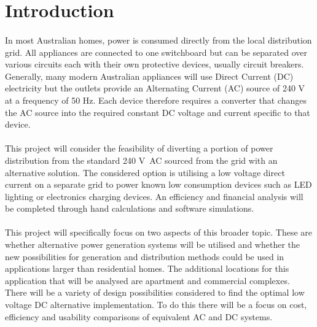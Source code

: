 
\section{Introduction}

\paragraph{} 
In most Australian homes, power is consumed directly from the local distribution grid. All appliances are connected to one switchboard but can be separated over various circuits each with their own protective devices, usually circuit breakers. Generally, many modern Australian appliances will use Direct Current (DC) electricity but the outlets provide an Alternating Current (AC) source of 240 \si{V} at a frequency of 50 \si{Hz}. Each device therefore requires a converter that changes the AC source into the required constant DC voltage and current specific to that device. 

\paragraph{} 
This project will consider the feasibility of diverting a portion of power distribution from the standard 240 \si{V AC} sourced from the grid with an alternative solution. The considered option is utilising a low voltage direct current on a separate grid to power known low consumption devices such as LED lighting or electronics charging devices. An efficiency and financial analysis will be completed through hand calculations and software simulations.  

\paragraph{} 
This project will specifically focus on two aspects of this broader topic. These are whether alternative power generation systems will be utilised and whether the new possibilities for generation and distribution methods could be used in applications larger than residential homes. The additional locations for this application that will be analysed are apartment and commercial complexes. There will be a variety of design possibilities considered to find the optimal low voltage DC alternative implementation. To do this there will be a focus on cost, efficiency and usability comparisons of equivalent AC and DC systems.   

\newpage